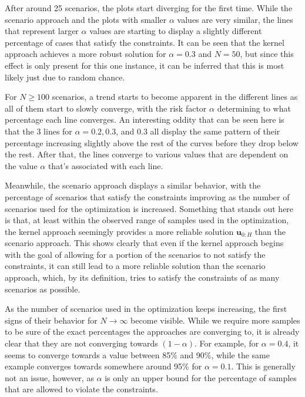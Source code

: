 After around 25 scenarios, the plots start diverging for the first time. While the scenario approach and the plots with smaller $\alpha$ values are very similar, the lines that represent larger $\alpha$ values are starting to display a slightly different percentage of cases that satisfy the constraints. It can be seen that the kernel approach achieves a more robust solution for $\alpha = 0.3$ and $N = 50$, but since this effect is only present for this one instance, it can be inferred that this is most likely just due to random chance.

For $N \geq 100$ scenarios, a trend starts to become apparent in the different lines as all of them start to slowly converge, with the risk factor $\alpha$ determining to what percentage each line converges. An interesting oddity that can be seen here is that the 3 lines for $\alpha = 0.2, 0.3$, and $0.3$ all display the same pattern of their percentage increasing slightly above the rest of the curves before they drop below the rest. After that, the lines converge to various values that are dependent on the value $\alpha$ that's associated with each line.

Meanwhile, the scenario approach displays a similar behavior, with the percentage of scenarios that satisfy the constraints improving as the number of scenarios used for the optimization is increased. Something that stands out here is that, at least within the observed range of samples used in the optimization, the kernel approach seemingly provides a more reliable solution $\boldsymbol{u}_{0:H}$ than the scenario approach. This shows clearly that even if the kernel approach begins with the goal of allowing for a portion of the scenarios to not satisfy the constraints, it can still lead to a more reliable solution than the scenario approach, which, by its definition, tries to satisfy the constraints of as many scenarios as possible.

As the number of scenarios used in the optimization keeps increasing, the first signs of their behavior for $N \to \infty$ become visible. While we require more samples to be sure of the exact percentages the approaches are converging to, it is already clear that they are not converging towards $(1 - \alpha)$. For example, for $\alpha = 0.4$, it seems to converge towards a value between 85\% and 90\%, while the same example converges towards somewhere around 95\% for $\alpha = 0.1$. This is generally not an issue, however, as $\alpha$ is only an upper bound for the percentage of samples that are allowed to violate the constraints.
 
